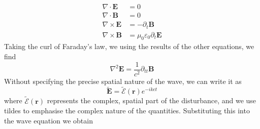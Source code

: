 \documentclass[a4paper,11pt]{article}
\begin{document}
\begin{align}
\nabla \cdot{\textbf{E}} &= 0\\
\nabla \cdot{\textbf{B}} &= 0\\
\nabla \times \textbf{E} &= -\partial_t\textbf{B}\\
\nabla \times \textbf{B} &= \mu_0 \varepsilon_0 \partial_t\textbf{E}
\end{align}
Taking the curl of Faraday's law, we using the results of the other equations, we find 
\begin{equation}
\nabla^2 \textbf{E} = \frac{1}{c^2} \partial_{tt}{\textbf{B}}
\end{equation}
Without specifying the precise spatial nature of the wave, we can write it as 
\begin{equation}
\tilde{\textbf{E}} = \tilde{\pmb{\mathscr{E}}}(\textbf{r})e^{-ikct}
\end{equation}
where $\tilde{\pmb{\mathscr{E}}}(\textbf{r})$ represents the complex, spatial part of the disturbance, and we use tildes to emphasise the complex nature of the quantities. Substituting this into the wave equation we obtain
\end{document}
